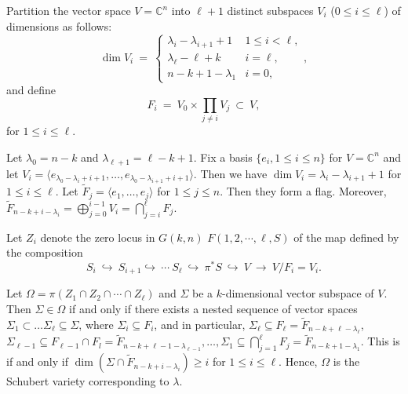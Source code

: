\documentclass[12pt]{article}
\begin{document}
Partition the vector space $V = {\mathbb C}^n$ into $\ell+1$ distinct subspaces
$V_i$ ($0 \leq i \leq \ell$) of dimensions as follows:
\begin{equation}
\dim V_i \: = \: \left\{ \begin{array}{cl}
\lambda_i - \lambda_{i+1} + 1 & 1 \leq i < \ell, \\
\lambda_{\ell} - \ell + k & i = \ell, \\
n - k + 1 - \lambda_1 & i = 0,
\end{array} \right.,
\end{equation}
and define
\begin{equation}
F_i \: = \: V_0 \times \prod_{j \neq i} V_j \: \subset \: V,
\end{equation}
for $1 \leq i \leq \ell$.

{
    \color{blue} Let \(\lambda_0=n-k\) and \(\lambda_{\ell+1}=\ell-k+1\). Fix a basis \(\{e_i, 1\leq i\leq n\}\) for \(V=\mathbb{C}^n\) and let \(V_i=\langle e_{\lambda_0-\lambda_{i}+i+1},\dots,e_{\lambda_0-\lambda_{i+1}+i+1}\rangle\). Then we have \(\dim V_i=\lambda_i-\lambda_{i+1}+1\) for \(1\leq i\leq \ell\).
    Let \(\tilde{F}_j=\langle e_1,\dots,e_j\rangle\) for \(1\leq j\leq n\). Then they form a flag. Moreover, \(\tilde{F}_{n-k+i-\lambda_i}=\bigoplus_{j=0}^{i-1}V_i=\bigcap_{j=i}^\ell F_j\).
}

Let $Z_i$ denote the zero locus in $G(k,n)$ {\color{blue}$F(1,2,\cdots,\ell,S)$} of the map defined by
the composition
\begin{equation}
S_i \: \hookrightarrow \: S_{i+1} \hookrightarrow \: \cdots \:
S_{\ell} \: \hookrightarrow \: \pi^* S \: \hookrightarrow \:
V \: \longrightarrow \: V / F_i = V_i.
\end{equation}

{\color{blue}Let \(\Omega=\pi(Z_1 \cap Z_2 \cap \cdots \cap Z_{\ell})\) and \(\Sigma\) be a \(k\)-dimensional vector subspace of \(V\). Then \(\Sigma\in\Omega\) if and only if there exists a nested sequence of vector spaces \(\Sigma_1\subset\dots\Sigma_\ell\subseteq\Sigma\), where \(\Sigma_i\subseteq F_i\), and in particular, \(\Sigma_\ell\subseteq F_\ell=\tilde{F}_{n-k+\ell-\lambda_\ell}\), \(\Sigma_{\ell-1}\subseteq F_{\ell-1}\cap F_l=\tilde{F}_{n-k+\ell-1-\lambda_{\ell-1}},\dots,\Sigma_1\subseteq\bigcap_{j=1}^\ell F_j=\tilde{F}_{n-k+1-\lambda_1}\). This is if and only if \(\dim(\Sigma\cap \tilde{F}_{n-k+i-\lambda_i})\geq i\) for \(1\leq i\leq \ell\). Hence, \(\Omega\) is the Schubert variety corresponding to \(\lambda\).
}
\end{document}
